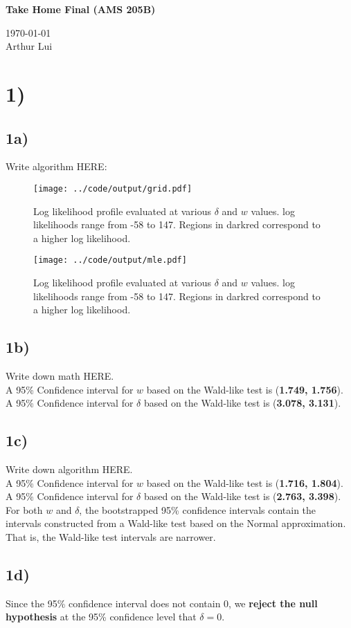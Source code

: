 \documentclass[11pt]{article}
\def\wl{\par \vspace{\baselineskip}\noindent}
\def\beginmyfig{\begin{figure}[H]\center} %
\def\endmyfig{\end{figure}}
\def\hline{ \textcolor{lgrey}{\hrulefill} }
\begin{document}
\begin{center}
  {\huge \textbf{Take Home Final (AMS 205B)}
  }\\
  \wl
  \noindent\today\\
  Arthur Lui\\
  \hline
\end{center}

\section*{1)}
\subsection*{1a)}
Write algorithm HERE:\\

\beginmyfig
  \texttt{[image: ../code/output/grid.pdf]}
  \caption{\small Log likelihood profile evaluated at various $\delta$ and $w$ values. log likelihoods range from -58 to 147. Regions in darkred correspond to a higher log likelihood.}
  \label{fig:grid}
\endmyfig

\beginmyfig
  \texttt{[image: ../code/output/mle.pdf]}
  \caption{\small Log likelihood profile evaluated at various $\delta$ and $w$ values. log likelihoods range from -58 to 147. Regions in darkred correspond to a higher log likelihood.}
  \label{fig:grid}
\endmyfig

\subsection*{1b)}
Write down math HERE.\\

\noindent
A 95\% Confidence interval for $w$ based on the Wald-like test is (\textbf{1.749, 1.756}).\\
A 95\% Confidence interval for $\delta$ based on the Wald-like test is (\textbf{3.078, 3.131}).

\subsection*{1c)}
Write down algorithm HERE.\\

\noindent
A 95\% Confidence interval for $w$ based on the Wald-like test is (\textbf{1.716, 1.804}).\\
A 95\% Confidence interval for $\delta$ based on the Wald-like test is (\textbf{2.763, 3.398}).\\

\noindent
For both $w$ and $\delta$, the bootstrapped 95\% confidence intervals contain
the intervals constructed from a Wald-like test based on the Normal
approximation. That is, the Wald-like test intervals are narrower.

\subsection*{1d)}
Since the 95\% confidence interval does not contain 0, we \textbf{reject the
null hypothesis} at the 95\% confidence level that $\delta=0$.
\end{document}

